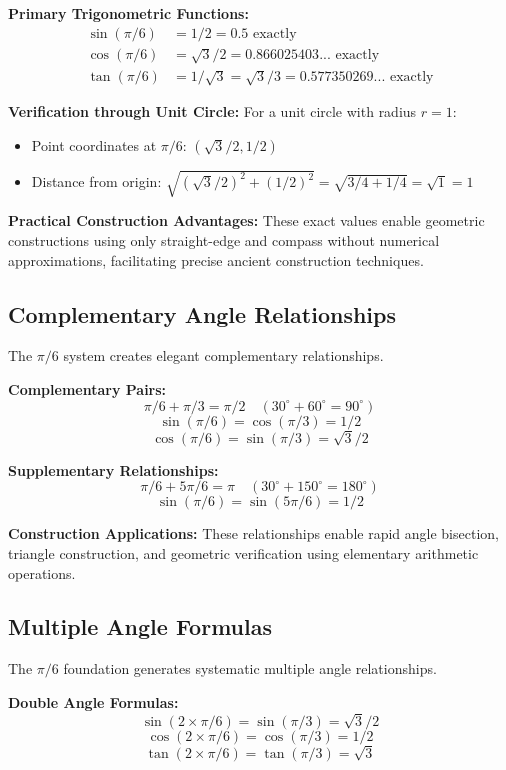 \documentclass[11pt]{article}
\begin{document}
\textbf{Primary Trigonometric Functions:}
\begin{align*}
\sin(\pi/6) &= 1/2 = 0.5 \text{ exactly} \\
\cos(\pi/6) &= \sqrt{3}/2 = 0.866025403... \text{ exactly} \\
\tan(\pi/6) &= 1/\sqrt{3} = \sqrt{3}/3 = 0.577350269... \text{ exactly}
\end{align*}

\textbf{Verification through Unit Circle:}
For a unit circle with radius $r = 1$:
\begin{itemize}
    \item Point coordinates at $\pi/6$: $(\sqrt{3}/2, 1/2)$
    \item Distance from origin: $\sqrt{(\sqrt{3}/2)^2 + (1/2)^2} = \sqrt{3/4 + 1/4} = \sqrt{1} = 1$ 
\end{itemize}

\textbf{Practical Construction Advantages:} These exact values enable geometric constructions using only straight-edge and compass without numerical approximations, facilitating precise ancient construction techniques.

\subsection{Complementary Angle Relationships}
The $\pi/6$ system creates elegant complementary relationships.

\textbf{Complementary Pairs:}
\[ \pi/6 + \pi/3 = \pi/2 \quad (30^\circ + 60^\circ = 90^\circ) \]
\[ \sin(\pi/6) = \cos(\pi/3) = 1/2 \]
\[ \cos(\pi/6) = \sin(\pi/3) = \sqrt{3}/2 \]

\textbf{Supplementary Relationships:}
\[ \pi/6 + 5\pi/6 = \pi \quad (30^\circ + 150^\circ = 180^\circ) \]
\[ \sin(\pi/6) = \sin(5\pi/6) = 1/2 \]

\textbf{Construction Applications:} These relationships enable rapid angle bisection, triangle construction, and geometric verification using elementary arithmetic operations.

\subsection{Multiple Angle Formulas}
The $\pi/6$ foundation generates systematic multiple angle relationships.

\textbf{Double Angle Formulas:}
\[ \sin(2 \times \pi/6) = \sin(\pi/3) = \sqrt{3}/2 \]
\[ \cos(2 \times \pi/6) = \cos(\pi/3) = 1/2 \]
\[ \tan(2 \times \pi/6) = \tan(\pi/3) = \sqrt{3} \]
\end{document}
